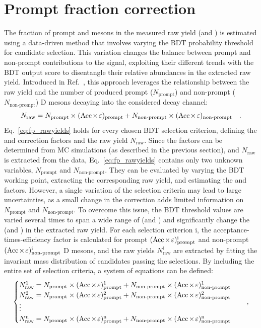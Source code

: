 \section{Prompt fraction correction}\label{sec:fp}
The fraction of prompt \ds and \dpl mesons in the measured raw yield (\fpds and \fpdpl) is estimated using a data-driven method that involves varying the BDT probability threshold for candidate selection. This variation changes the balance between prompt and non-prompt contributions to the signal, exploiting their different trends with the BDT output score to disentangle their relative abundances in the extracted raw yield. Introduced in Ref.~\cite{ALICE:2021mgk}, this approach leverages the relationship between the raw yield and the number of produced prompt ($N_\mathrm{prompt}$) and non-prompt ($N_\mathrm{non\text{-}prompt}$) D mesons decaying into the considered decay channel:
\begin{equation}\label{eq:fp_rawyields}
    N_\mathrm{raw} = N_\mathrm{prompt}\times(\mathrm{Acc}\mkern-2mu\times\mkern-2mu\varepsilon)_\mathrm{prompt} + N_\mathrm{non\text{-}prompt} \times (\mathrm{Acc}\mkern-2mu\times\mkern-2mu\varepsilon)_\mathrm{non\text{-}prompt}\quad .
\end{equation}
\vspace{0.1cm}
Eq.~\ref{eq:fp_rawyields} holds for every chosen BDT selection criterion, defining the \aeffp and \aeffnp correction factors and the raw yield $N_\mathrm{raw}$. Since the \aeff factors can be determined from MC simulations (as described in the previous section), and $N_\mathrm{raw}$ is extracted from the data, Eq.~\ref{eq:fp_rawyields} contains only two unknown variables, $N_\mathrm{prompt}$ and $N_\mathrm{non\text{-}prompt}$. They can be evaluated by varying the BDT working point, extracting the corresponding raw yield, and estimating the \aeffp and \aeffnp factors. However, a single variation of the selection criteria may lead to large uncertainties, as a small change in the \aeff correction adds limited information on $N_\mathrm{prompt}$ and $N_\mathrm{non\text{-}prompt}$. To overcome this issue, the BDT threshold values are varied several times to span a wide range of \aeffp (and \aeffnp) and significantly change the \fp (and \fnp) in the extracted raw yield. For each selection criterion i, the acceptance-times-efficiency factor is calculated for prompt $(\mathrm{Acc}\mkern-2mu\times\mkern-2mu\varepsilon)_\mathrm{prompt}^\mathrm{i}$ and non-prompt $(\mathrm{Acc}\mkern-2mu\times\mkern-2mu\varepsilon)_\mathrm{non\text{-}prompt}^\mathrm{i}$ D mesons, and the raw yields $N_\mathrm{raw}^\mathrm{i}$ are extracted by fitting the invariant mass distribution of candidates passing the selections. By including the entire set of selection criteria, a system of equations can be defined:
\begin{equation*}
    \begin{cases}
        N_\mathrm{raw}^1 = N_\mathrm{prompt}\times(\mathrm{Acc}\mkern-2mu\times\mkern-2mu\varepsilon)_\mathrm{prompt}^1 + N_\mathrm{non\text{-}prompt} \times (\mathrm{Acc}\mkern-2mu\times\mkern-2mu\varepsilon)_\mathrm{non\text{-}prompt}^1\\
        N_\mathrm{raw}^2 = N_\mathrm{prompt}\times(\mathrm{Acc}\mkern-2mu\times\mkern-2mu\varepsilon)_\mathrm{prompt}^2 + N_\mathrm{non\text{-}prompt} \times (\mathrm{Acc}\mkern-2mu\times\mkern-2mu\varepsilon)_\mathrm{non\text{-}prompt}^2\\
        \vdots\\
        N_\mathrm{raw}^\mathrm{n} = N_\mathrm{prompt}\times(\mathrm{Acc}\mkern-2mu\times\mkern-2mu\varepsilon)_\mathrm{prompt}^\mathrm{n} + N_\mathrm{non\text{-}prompt} \times (\mathrm{Acc}\mkern-2mu\times\mkern-2mu\varepsilon)_\mathrm{non\text{-}prompt}^\mathrm{n}
    \end{cases}
    \quad ,
\end{equation*}
